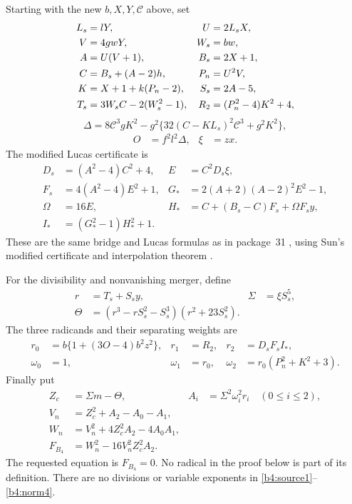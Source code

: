 Starting with the new $b,X,Y,\mathscr C$ above, set
\begin{align}
 L_s&=lY,& U&=2L_sX,\notag\\
 V&=4gwY,& W_s&=bw,
 \label{b4:bridge1}\\
 A&=U(V+1),& B_s&=2X+1,\notag\\
 C&=B_s+(A-2)h,& P_n&=U^2V,
 \label{b4:bridge2}\\
 K&=X+1+k(P_n-2),&
 S_s&=2A-5,
 \label{b4:bridge3}\\
 T_s&=3W_sC-2(W_s^2-1),&
 R_2&=(P_n^2-4)K^2+4,
 \label{b4:bridge4}
\end{align}
\begin{equation}
 \Delta=8\mathscr C^3gK^2
       -g^2\{32(C-KL_s)^2\mathscr C^3+g^2K^2\},
 \label{b4:bridge5}
\end{equation}
\begin{align}
 O&=f^2l^2\Delta,&
 \xi&=zx.
 \label{b4:bridge6}
\end{align}
The modified Lucas certificate is
\begin{align}
 D_s&=(A^2-4)C^2+4,&
 E&=C^2D_s\xi,
 \label{b4:lucas1}\\
 F_s&=4(A^2-4)E^2+1,&
 G_*&=2(A+2)(A-2)^2E^2-1,
 \label{b4:lucas2}\\
 \Omega&=16E,&
 H_*&=C+(B_s-C)F_s+\Omega F_sy,
 \label{b4:lucas3}\\
 I_*&=(G_*^2-1)H_*^2+1.
 \label{b4:lucas4}
\end{align}
These are the same bridge and Lucas formulas as in package~31
\cite{Package31}, using Sun's modified certificate and interpolation
theorem \cite{Sun2026}.

For the divisibility and nonvanishing merger, define
\begin{align}
 r&=T_s+S_sy,&
 \Sigma&=\xi S_s^5,
 \label{b4:merge1}\\
 \Theta&=(r^3-rS_s^2-S_s^3)(r^2+23S_s^2).
 \label{b4:merge2}
\end{align}
The three radicands and their separating weights are
\begin{align}
 r_0&=b\{1+(3O-4)b^2z^2\},&
 r_1&=R_2,&
 r_2&=D_sF_sI_*,
 \label{b4:radicands}\\
 \omega_0&=1,&
 \omega_1&=r_0,&
 \omega_2&=r_0(P_n^2+K^2+3).
 \label{b4:weights}
\end{align}
Finally put
\begin{align}
 Z_c&=\Sigma m-\Theta,&
 A_i&=\Sigma^2\omega_i^2r_i\quad(0\le i\le2),
 \label{b4:norm1}\\
 V_n&=Z_c^2+A_2-A_0-A_1,
 \label{b4:norm2}\\
 W_n&=V_n^2+4Z_c^2A_2-4A_0A_1,
 \label{b4:norm3}\\
 \boxed{F_{B_4}}&\boxed{{}=W_n^2-16V_n^2Z_c^2A_2.}
 \label{b4:norm4}
\end{align}
The requested equation is $F_{B_4}=0$.  No radical in the proof below
is part of its definition.  There are no divisions or variable
exponents in \eqref{b4:source1}--\eqref{b4:norm4}.


